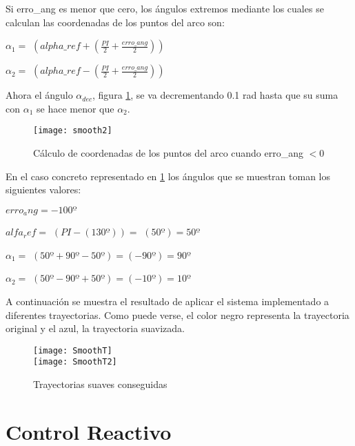 Si erro\_ang es menor que cero, los ángulos extremos mediante los cuales se calculan las coordenadas de los puntos del arco son:

\begin{center}
$\alpha_{1} =$ $(alpha\_ref + (\frac{PI}{2} + \frac{erro\_ang}{2}))$
\end{center}

\begin{center}
$\alpha_{2} =$ $(alpha\_ref - (\frac{PI}{2} + \frac{erro\_ang}{2}))$
\end{center}

Ahora el ángulo $\alpha_{dec}$, figura \ref{fg:smooth2}, se va decrementando 0.1 rad hasta que su suma con $\alpha_{1}$ se hace menor que $\alpha_{2}$.

\begin{figure}[h]
  \centering\texttt{[image: smooth2]}\\
  \caption{Cálculo de coordenadas de los puntos del arco cuando erro\_ang $< 0$}\label{fg:smooth2}
\end{figure}

En el caso concreto representado en \ref{fg:smooth2} los ángulos que se muestran toman los siguientes valores:
\vspace{0.5cm}

${erro_ang} = -100º$

$alfa_ref =$ $(PI - (130º)) =$ $(50º) = 50º$

$\alpha_{1} =$ $(50º + 90º - 50º) = $$(-90º) = 90º$

$\alpha_{2} =$ $(50º - 90º +50º) = $$(-10º) = 10º$

\vspace{0.5cm}
A continuación se muestra el resultado de aplicar el sistema implementado a diferentes trayectorias. Como puede verse, el color negro representa la trayectoria original y el azul, la trayectoria suavizada.

\begin{figure}[h]
  \centering\texttt{[image: SmoothT]}\\
  \vspace{0.2cm}\texttt{[image: SmoothT2]}\label{fg:smoothT}
  \caption{Trayectorias suaves conseguidas}
\end{figure}

\section{Control Reactivo}\label{reactivo}

